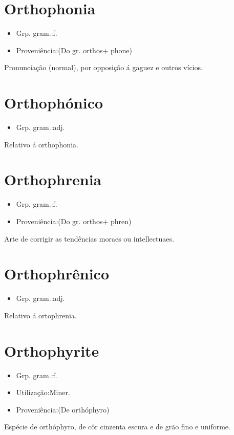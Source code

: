 \section{Orthophonia}
\begin{itemize}
\item {Grp. gram.:f.}
\end{itemize}
\begin{itemize}
\item {Proveniência:(Do gr. \textunderscore orthos\textunderscore  + \textunderscore phone\textunderscore )}
\end{itemize}
Pronunciação (normal), por opposição á gaguez e outros vícios.
\section{Orthophónico}
\begin{itemize}
\item {Grp. gram.:adj.}
\end{itemize}
Relativo á orthophonia.
\section{Orthophrenia}
\begin{itemize}
\item {Grp. gram.:f.}
\end{itemize}
\begin{itemize}
\item {Proveniência:(Do gr. \textunderscore orthos\textunderscore  + \textunderscore phren\textunderscore )}
\end{itemize}
Arte de corrigir as tendências moraes ou intellectuaes.
\section{Orthophrênico}
\begin{itemize}
\item {Grp. gram.:adj.}
\end{itemize}
Relativo á ortophrenia.
\section{Orthophyrite}
\begin{itemize}
\item {Grp. gram.:f.}
\end{itemize}
\begin{itemize}
\item {Utilização:Miner.}
\end{itemize}
\begin{itemize}
\item {Proveniência:(De \textunderscore orthóphyro\textunderscore )}
\end{itemize}
Espécie de orthóphyro, de côr cinzenta escura e de grão fino e uniforme.
